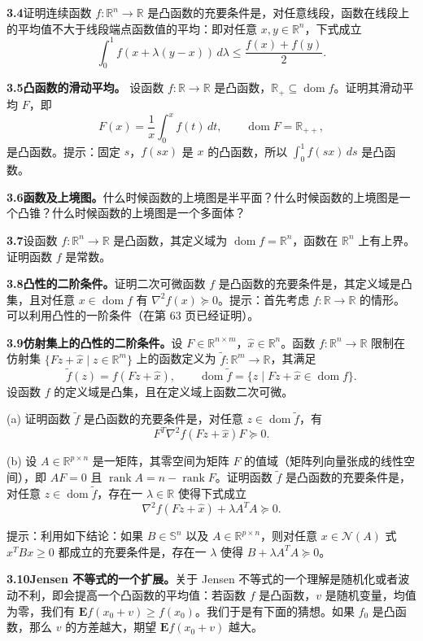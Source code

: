 \documentclass[UTF8,12pt,a4paper,fontset=fandol]{ctexart}
\DeclareMathOperator{\dom}{dom}
\begin{document}
\noindent\textbf{3.4}\quad [RV73，第 15 页] 证明连续函数 $f:\mathbb{R}^n\to\mathbb{R}$ 是凸函数的充要条件是，对任意线段，函数在线段上的平均值不大于线段端点函数值的平均：即对任意 $x,y\in\mathbb{R}^n$，下式成立
\[
\int_0^1 f(x+\lambda(y-x))\,d\lambda\leq \frac{f(x)+f(y)}{2}.
\]

\noindent\textbf{3.5}\quad [RV73，第 22 页] \textbf{凸函数的滑动平均。} 设函数 $f:\mathbb{R}\to\mathbb{R}$ 是凸函数，$\mathbb{R}_+\subseteq\dom f$。证明其滑动平均 $F$，即
\[
F(x)=\frac{1}{x}\int_0^x f(t)\,dt,\qquad \dom F=\mathbb{R}_{++},
\]
是凸函数。提示：固定 $s$，$f(sx)$ 是 $x$ 的凸函数，所以 $\int_0^1 f(sx)\,ds$ 是凸函数。

\noindent\textbf{3.6\quad 函数及上境图。}\quad 什么时候函数的上境图是半平面？什么时候函数的上境图是一个凸锥？什么时候函数的上境图是一个多面体？

\noindent\textbf{3.7}\quad 设函数 $f:\mathbb{R}^n\to\mathbb{R}$ 是凸函数，其定义域为 $\dom f=\mathbb{R}^n$，函数在 $\mathbb{R}^n$ 上有上界。证明函数 $f$ 是常数。

\noindent\textbf{3.8\quad 凸性的二阶条件。}\quad 证明二次可微函数 $f$ 是凸函数的充要条件是，其定义域是凸集，且对任意 $x\in\dom f$ 有 $\nabla^2 f(x)\succeq0$。提示：首先考虑 $f:\mathbb{R}\to\mathbb{R}$ 的情形。可以利用凸性的一阶条件（在第 63 页已经证明）。

\noindent\textbf{3.9\quad 仿射集上的凸性的二阶条件。}\quad 设 $F\in\mathbb{R}^{n\times m}$，$\hat x\in\mathbb{R}^n$。函数 $f:\mathbb{R}^n\to\mathbb{R}$ 限制在仿射集 $\{Fz+\hat x\mid z\in\mathbb{R}^m\}$ 上的函数定义为 $\tilde f:\mathbb{R}^m\to\mathbb{R}$，其满足
\[
\tilde f(z)=f(Fz+\hat x),\qquad
\dom\tilde f=\{z\mid Fz+\hat x\in\dom f\}.
\]
设函数 $f$ 的定义域是凸集，且在定义域上函数二次可微。

(a) 证明函数 $\tilde f$ 是凸函数的充要条件是，对任意 $z\in\dom\tilde f$，有
\[
F^T\nabla^2 f(Fz+\hat x)F\succeq0.
\]

(b) 设 $A\in\mathbb{R}^{p\times n}$ 是一矩阵，其零空间为矩阵 $F$ 的值域（矩阵列向量张成的线性空间），即 $AF=0$ 且 $\operatorname{rank}A=n-\operatorname{rank}F$。证明函数 $\tilde f$ 是凸函数的充要条件是，对任意 $z\in\dom\tilde f$，存在一 $\lambda\in\mathbb{R}$ 使得下式成立
\[
\nabla^2 f(Fz+\hat x)+\lambda A^TA\succeq0.
\]

提示：利用如下结论：如果 $B\in\mathbb{S}^n$ 以及 $A\in\mathbb{R}^{p\times n}$，则对任意 $x\in\mathcal{N}(A)$ 式 $x^TBx\geq0$ 都成立的充要条件是，存在一 $\lambda$ 使得 $B+\lambda A^TA\succeq0$。

\noindent\textbf{3.10\quad Jensen 不等式的一个扩展。}\quad 关于 Jensen 不等式的一个理解是随机化或者波动不利，即会提高一个凸函数的平均值：若函数 $f$ 是凸函数，$v$ 是随机变量，均值为零，我们有 $\mathbf{E}f(x_0+v)\geq f(x_0)$。我们于是有下面的猜想。如果 $f_0$ 是凸函数，那么 $v$ 的方差越大，期望 $\mathbf{E}f(x_0+v)$ 越大。
\end{document}
